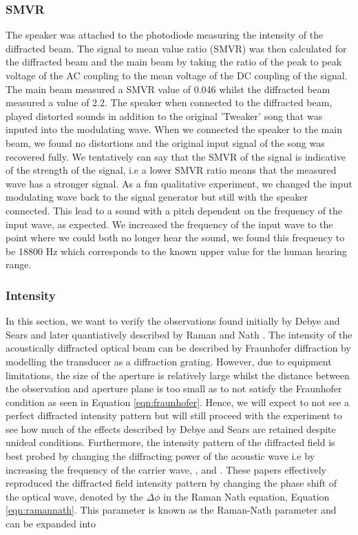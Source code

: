 \documentclass[aps,prl,reprint,10pt,amsmath,amssymb,superscriptaddress,a4paper]{revtex4-2}
\begin{document}
\subsubsection{SMVR}

The speaker was attached to the photodiode measuring the intensity of the diffracted beam. The signal to mean value ratio (SMVR) was then calculated for the diffracted beam and the main beam by 
taking the ratio of the peak to peak voltage of the AC coupling to the mean voltage of the DC coupling of the signal. The main beam measured a SMVR value of 0.046 whilst the diffracted beam 
measured a value of 2.2. The speaker when connected to the diffracted beam, played distorted sounds in addition to the original 'Tweaker' song that was inputed into the modulating wave. When we 
connected the speaker to the main beam, we found no distortions and the original input signal of the song was recovered fully. We tentatively can say that the SMVR of the signal is indicative of 
the strength of the signal, i.e a lower SMVR ratio means that the measured wave has a stronger signal. As a fun qualitative experiment, we changed the input modulating wave back to the signal 
generator but still with the speaker connected. This lead to a sound with a pitch dependent on the frequency of the input wave, as expected. We increased the frequency of the input wave to the 
point where we could both no longer hear the sound, we found this frequency to be 18800 Hz which corresponds to the known upper value for the human hearing range. 

\subsubsection{Intensity}

In this section, we want to verify the observations found initially by Debye and Sears \citep{DebyeSears} and later quantiatively described by Raman and Nath \citep{RamanNath}. The intensity of 
the acoustically diffracted optical beam can be described by Fraunhofer diffraction by modelling the transducer as a diffraction grating. However, due to equipment limitations, the size of the 
aperture is relatively large whilst the distance between the observation and aperture plane is too small as to not satisfy the Fraunhofer condition as seen in Equation \ref{eqn:fraunhofer}. Hence, 
we will expect to not see a perfect diffracted intensity pattern but will still proceed with the experiment to see how much of the effects described by Debye and Sears are retained despite unideal 
conditions. Furthermore, the intensity pattern of the diffracted field is best probed by changing the diffracting power of the acoustic wave i.e by increasing the frequency of the carrier wave, 
\citep{Zakharov}, \citep{Gao} and \citep{Kwiek}. These papers effectively reproduced the diffracted field intensity pattern by changing the phase shift of the optical wave, denoted by the $\Delta \phi$
in the Raman Nath equation, Equation \ref{eqn:ramannath}. This parameter is known as the Raman-Nath parameter and can be expanded into 
\end{document}
